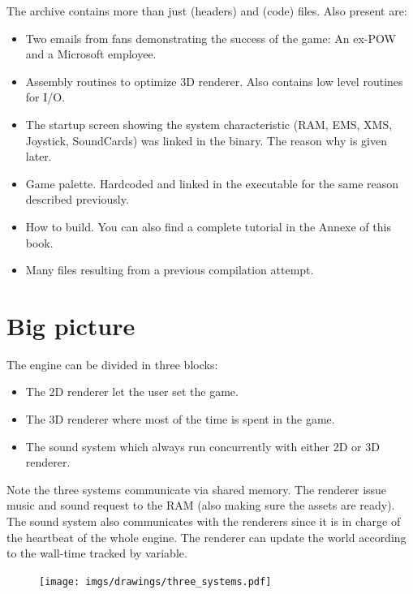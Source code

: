 \documentclass[book.tex]{subfiles}
\begin{document}
The archive contains more than just  (headers) and  (code) files. Also present are:
\begin{itemize}
\item {} Two emails from fans demonstrating the success of the game: An ex-POW and a Microsoft employee.
\item {} Assembly routines to optimize 3D renderer. Also contains low level routines for I/O.
\item {} The startup screen showing the system characteristic (RAM, EMS, XMS, Joystick, SoundCards) was linked in the binary. The reason why is given later.
\item {} Game palette. Hardcoded and linked in the executable for the same reason described previously.
\item {} How to build. You can also find a complete tutorial in the Annexe of this book.
\item Many files resulting from a previous compilation attempt.
\end{itemize}







\section{Big picture}
The engine can be divided in three blocks:
\begin{itemize}
\item The 2D renderer let the user set the game.
\item The 3D renderer where most of the time is spent in the game.
\item The sound system which always run concurrently with either 2D or 3D renderer. 
\end{itemize}
Note the three systems communicate via shared memory. The renderer issue music and sound request to the RAM (also making sure the assets are ready). The sound system also communicates with the renderers since it is in charge of the heartbeat of the whole engine. The renderer can update the world according to the wall-time tracked by  variable.
\par
\begin{figure}[H]
\centering
 \texttt{[image: imgs/drawings/three\_systems.pdf]}
 \end{figure}
 \par
\end{document}
